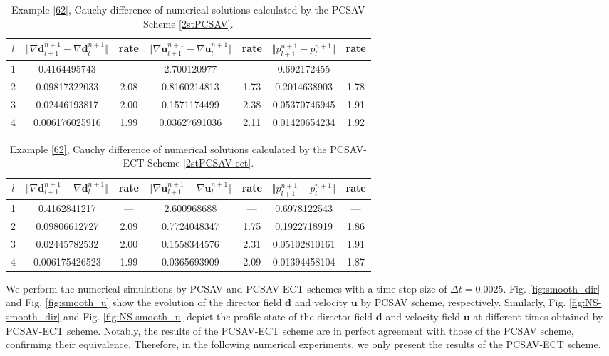 \documentclass[12pt,reqno]{amsart}
\numberwithin{equation}{section}
\newcommand{\uu}{\mathrm{\textbf{u}}}
\newcommand{\dd}{\mathrm{\textbf{d}}}
\begin{document}
\begin{table}[tp]
\centering
{\small
\caption{\noindent
Example \ref{62}, Cauchy difference of numerical solutions calculated by the PCSAV Scheme \ref{2stPCSAV}.}
\label{tab:PROSAV}
\begin{tabular}{|c||c|c||c|c||c|c|}
\hline
$l$& $\Vert \nabla \dd^{n+1}_{l+1}-\nabla \dd^{n+1}_{l}\Vert$ & rate&  $\Vert \nabla \uu^{n+1}_{l+1}-\nabla \uu^{n+1}_{l}\Vert$ & rate& $\Vert p^{n+1}_{l+1}-p^{n+1}_{l}\Vert$ & rate \\
\hline
1  &0.4164495743  &   --- & 2.700120977  &   --- & 0.692172455 &   ---  \\
2  & 0.09817322033 &  2.08  &  0.8160214813 &   1.73  & 0.2014638903 &  1.78  \\
3  & 0.02446193817  & 2.00  & 0.1571174499	 &   2.38  & 0.05370746945 &  1.91  \\
4  &  0.006176025916 & 1.99 &  0.03627691036 &   2.11  & 0.01420654234 &   1.92  \\
\hline
\end{tabular}
}
\end{table}

\begin{table}[tp]
\centering
{\small
\caption{\noindent
Example \ref{62}, Cauchy difference of numerical solutions calculated by the PCSAV-ECT Scheme \ref{2stPCSAV-ect}.}
\label{tab:PROSAV-ECT}
\begin{tabular}{|c||c|c||c|c||c|c|}
\hline
$l$& $\Vert \nabla \dd^{n+1}_{l+1}-\nabla \dd^{n+1}_{l}\Vert$ & rate&  $\Vert \nabla \uu^{n+1}_{l+1}-\nabla \uu^{n+1}_{l}\Vert$ & rate& $\Vert p^{n+1}_{l+1}-p^{n+1}_{l}\Vert$ & rate \\
\hline
1  &0.4162841217  &   --- & 2.600968688 &   --- & 0.6978122543 &   ---  \\
2  & 0.09806612727 &  2.09  &  0.7724048347 &   1.75  & 	0.1922718919 &  1.86  \\
3  & 0.02445782532  & 2.00  & 0.1558344576 &   2.31  & 0.05102810161 &  1.91  \\
4  & 0.006175426523 & 1.99 &  0.0365693909 &   2.09  & 0.01394458104 &   1.87  \\
\hline
\end{tabular}
}
\end{table}

We perform the numerical simulations by PCSAV and PCSAV-ECT schemes with a time step size of $\Delta t=0.0025$.
Fig. \ref{fig:smooth_dir} and Fig. \ref{fig:smooth_u} show the evolution of the director field $\dd$ and velocity $\uu$ by PCSAV scheme, respectively.
Similarly, Fig. \ref{fig:NS-smooth_dir} and Fig. \ref{fig:NS-smooth_u} depict the profile state of the director field $\dd$ and velocity field $\uu$ at different times obtained by PCSAV-ECT scheme. 
Notably, the results of the PCSAV-ECT scheme are in perfect agreement with those of the PCSAV scheme, confirming their equivalence. 
Therefore, in the following numerical experiments, we only present the results of the PCSAV-ECT scheme.
\end{document}
